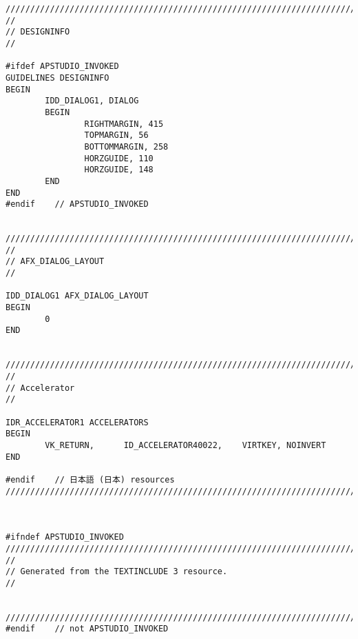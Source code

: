 \begin{lstlisting}[caption=resource.rc]
/////////////////////////////////////////////////////////////////////////////
//
// DESIGNINFO
//

#ifdef APSTUDIO_INVOKED
GUIDELINES DESIGNINFO
BEGIN
		IDD_DIALOG1, DIALOG
		BEGIN
				RIGHTMARGIN, 415
				TOPMARGIN, 56
				BOTTOMMARGIN, 258
				HORZGUIDE, 110
				HORZGUIDE, 148
		END
END
#endif    // APSTUDIO_INVOKED


/////////////////////////////////////////////////////////////////////////////
//
// AFX_DIALOG_LAYOUT
//

IDD_DIALOG1 AFX_DIALOG_LAYOUT
BEGIN
		0
END


/////////////////////////////////////////////////////////////////////////////
//
// Accelerator
//

IDR_ACCELERATOR1 ACCELERATORS
BEGIN
		VK_RETURN,      ID_ACCELERATOR40022,    VIRTKEY, NOINVERT
END

#endif    // 日本語 (日本) resources
/////////////////////////////////////////////////////////////////////////////



#ifndef APSTUDIO_INVOKED
/////////////////////////////////////////////////////////////////////////////
//
// Generated from the TEXTINCLUDE 3 resource.
//


/////////////////////////////////////////////////////////////////////////////
#endif    // not APSTUDIO_INVOKED	
\end{lstlisting}